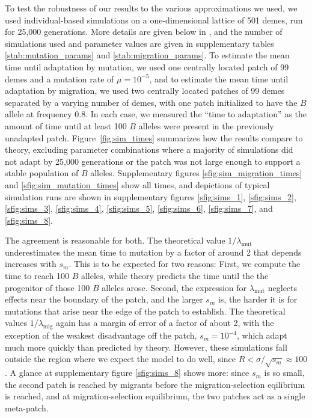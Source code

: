 \documentclass{article}
\newcommand{\migrate}{\lambda_\text{mig}}
\newcommand{\mutrate}{\lambda_\text{mut}}
\begin{document}
To test the robustness of our results to the various approximations we used,
we used individual-based simulations on a one-dimensional lattice of 501 demes,
run for 25,000 generations.
More details are given below in ,
and the number of simulations used and parameter values are given in supplementary tables \ref{stab:mutation_params} and \ref{stab:migration_params}.
To estimate the mean time until adaptation by mutation,
we used one centrally located patch of 99 demes
and a mutation rate of $\mu=10^{-5}$,
and to estimate the mean time until adaptation by migration,
we used two centrally located patches of 99 demes
separated by a varying number of demes,
with one patch initialized to have the $B$ allele at frequency 0.8.
In each case, we measured the ``time to adaptation'' as the amount of time until at least 100 $B$ alleles
were present in the previously unadapted patch.
Figure~\ref{fig:sim_times}
summarizes how the results compare to theory,
excluding parameter combinations where a majority of simulations did not adapt by 25,000 generations
or the patch was not large enough to support a stable population of $B$ alleles.
Supplementary figures \ref{sfig:sim_migration_times} and \ref{sfig:sim_mutation_times} 
show all times, 
and depictions of typical simulation runs are shown in supplementary figures
\ref{sfig:sims_1}, \ref{sfig:sims_2}, \ref{sfig:sims_3}, \ref{sfig:sims_4}, \ref{sfig:sims_5}, \ref{sfig:sims_6}, \ref{sfig:sims_7}, and \ref{sfig:sims_8}.

The agreement is reasonable for both.
The theoretical value $1/\mutrate$ underestimates the mean time to mutation
by a factor of around 2 that depends increases with $s_m$.
This is to be expected for two reasons:
First, we compute the time to reach 100 $B$ alleles, while theory predicts
the time until the the progenitor of those 100 $B$ alleles arose.
Second, the expression for $\mutrate$ neglects effects near the boundary of the patch,
and the larger $s_m$ is, 
the harder it is for mutations that arise near the edge of the patch to establish.
The theoretical values $1/\migrate$ again has a margin of error of a factor of about 2,
with the exception of the weakest disadvantage off the patch, $s_m=10^{-4}$,
which adapt much more quickly than predicted by theory.
However, these simulations fall outside the region where we expect the model to do well,
since $R < \sigma/\sqrt{s_m} \approx 100$.
A glance at supplementary figure \ref{sfig:sims_8} shows more:
since $s_m$ is so small, the second patch is reached by migrants before the migration-selection eqilibrium is reached,
and at migration-selection equilibrium, the two patches act as a single meta-patch.
\end{document}
